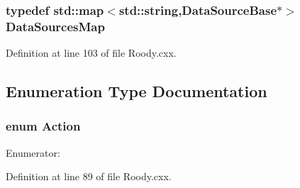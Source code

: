\subsubsection[{DataSourcesMap}]{\setlength{\rightskip}{0pt plus 5cm}typedef std::map$<$std::string,DataSourceBase$\ast$$>$ {\bf DataSourcesMap}}\label{Roody_8cxx_a983be03604153205d83c4c28d8b2891e}


Definition at line 103 of file Roody.cxx.



\subsection{Enumeration Type Documentation}
\subsubsection[{Action}]{\setlength{\rightskip}{0pt plus 5cm}enum {\bf Action}}\label{Roody_8cxx_a8bb1ef53467e4f61410d12822d922498}
\begin{Desc}
\item[Enumerator: ]\par
\begin{description}
\item[{\em 
A\_\-ITEM\label{Roody_8cxx_a8bb1ef53467e4f61410d12822d922498ad4f8562da213e20133393364451c5b44}
}]\item[{\em 
A\_\-FOLDER\label{Roody_8cxx_a8bb1ef53467e4f61410d12822d922498a506cbac1e552dac39438f1257f0a48db}
}]\item[{\em 
A\_\-SOURCE\label{Roody_8cxx_a8bb1ef53467e4f61410d12822d922498a2c9efb4d17b30eba2326dab6d8763d1a}
}]\item[{\em 
A\_\-GROUP\label{Roody_8cxx_a8bb1ef53467e4f61410d12822d922498a6d4bfa6b698453562f3ea0888b3362ad}
}]\end{description}
\end{Desc}



Definition at line 89 of file Roody.cxx.



